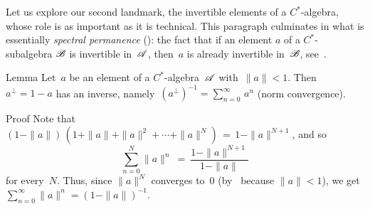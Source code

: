 \documentclass[a]{subfiles}
\begin{document}
%
%
\begin{parsec}%
\begin{point}%
Let us explore our second landmark,
the  invertible elements
of a $C^*$-algebra,
whose role 
is as important as it is technical.
This paragraph culminates in what is essentially
 \emph{spectral permanence} ():
the fact that if an element $a$ of a $C^*$-subalgebra $\mathscr{B}$
is invertible in~$\mathscr{A}$,
then~$a$ is already invertible in~$\mathscr{B}$,
see~.
\end{point}
\begin{point}[geometric]{Lemma}%
Let~$a$ be an element of a $C^*$-algebra~$\mathscr{A}$ with~$\|a\|<1$.
Then~$a^\perp=1-a$ has an inverse,
namely~$(a^\perp)^{-1}= \sum_{n=0}^\infty\, a^n$
(norm convergence).
\begin{point}{Proof}%
Note that
$(1-\|a\|)\,(1+\|a\|+\|a\|^2+\dotsb+\|a\|^N) \,=\, 1-\|a\|^{N+1}$,
and so 
\begin{equation*}
\sum_{n=0}^N \|a\|^n \ =\  \frac{1-\|a\|^{N+1}}{1-\|a\|}
\end{equation*}
for every~$N$.
Thus,
since $\|a\|^N$ converges to~$0$
(by~\TODO{} because $\|a\|<1$),
we  get $\sum_{n=0}^\infty \|a\|^n = (1-\|a\|)^{-1}$.


\end{point}
\end{point}
\end{parsec}
\end{document}
